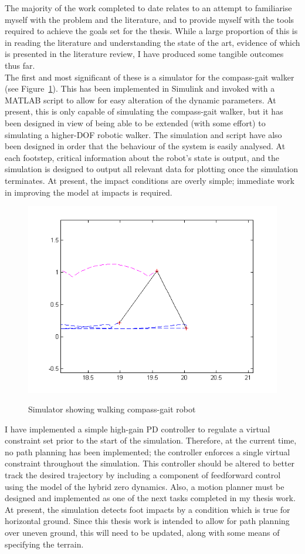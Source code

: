 The majority of the work completed to date relates to an attempt to familiarise myself with the problem and the literature, and to provide myself with the tools required to achieve the goals set for the thesis. While a large proportion of this is in reading the literature and understanding the state of the art, evidence of which is presented in the literature review, I have produced some tangible outcomes thus far. \\

The first and most significant of these is a simulator for the compass-gait walker (see Figure~\ref{fig:simsample}). This has been implemented in Simulink and invoked with a MATLAB script to allow for easy alteration of the dynamic parameters. At present, this is only capable of simulating the compass-gait walker, but it has been designed in view of being able to be extended (with some effort) to simulating a higher-DOF robotic walker. The simulation and script have also been designed in order that the behaviour of the system is easily analysed. At each footstep, critical information about the robot's state is output, and the simulation is designed to output all relevant data for plotting once the simulation terminates. At present, the impact conditions are overly simple; immediate work in improving the model at impacts is required.\\

\begin{figure}
	\centering
	\includegraphics[width=0.8\linewidth]{Images/sim.png}
	\label{fig:simsample}
	\caption{Simulator showing walking compass-gait robot}
\end{figure}

I have implemented a simple high-gain PD controller to regulate a virtual constraint set prior to the start of the simulation. Therefore, at the current time, no path planning has been implemented; the controller enforces a single virtual constraint throughout the simulation. This controller should be altered to better track the desired trajectory by including a component of feedforward control using the model of the hybrid zero dynamics. Also, a motion planner must be designed and implemented as one of the next tasks completed in my thesis work. At present, the simulation detects foot impacts by a condition which is true for horizontal ground. Since this thesis work is intended to allow for path planning over uneven ground, this will need to be updated, along with some means of specifying the terrain. \\

